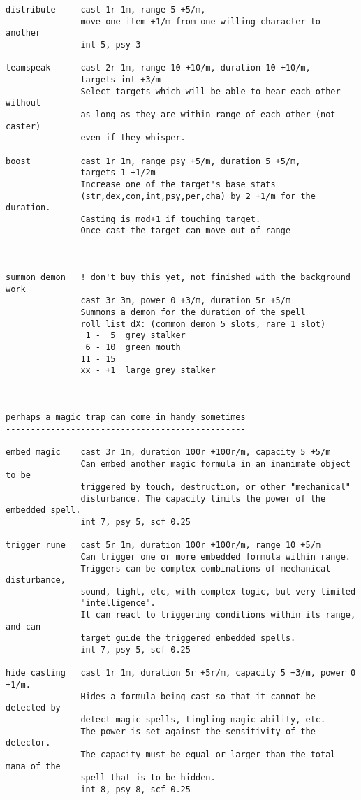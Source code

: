\begin{verbatim}
distribute     cast 1r 1m, range 5 +5/m,
               move one item +1/m from one willing character to another
               int 5, psy 3

teamspeak      cast 2r 1m, range 10 +10/m, duration 10 +10/m,
               targets int +3/m
               Select targets which will be able to hear each other without
               as long as they are within range of each other (not caster)
               even if they whisper.

boost          cast 1r 1m, range psy +5/m, duration 5 +5/m,
               targets 1 +1/2m
               Increase one of the target's base stats
               (str,dex,con,int,psy,per,cha) by 2 +1/m for the duration.
               Casting is mod+1 if touching target.
               Once cast the target can move out of range



summon demon   ! don't buy this yet, not finished with the background work
               cast 3r 3m, power 0 +3/m, duration 5r +5/m
               Summons a demon for the duration of the spell
               roll list dX: (common demon 5 slots, rare 1 slot)
                1 -  5  grey stalker
                6 - 10  green mouth
               11 - 15
               xx - +1  large grey stalker



perhaps a magic trap can come in handy sometimes
------------------------------------------------

embed magic    cast 3r 1m, duration 100r +100r/m, capacity 5 +5/m
               Can embed another magic formula in an inanimate object to be
               triggered by touch, destruction, or other "mechanical"
               disturbance. The capacity limits the power of the embedded spell.
               int 7, psy 5, scf 0.25

trigger rune   cast 5r 1m, duration 100r +100r/m, range 10 +5/m
               Can trigger one or more embedded formula within range.
               Triggers can be complex combinations of mechanical disturbance,
               sound, light, etc, with complex logic, but very limited
               "intelligence".
               It can react to triggering conditions within its range, and can
               target guide the triggered embedded spells.
               int 7, psy 5, scf 0.25

hide casting   cast 1r 1m, duration 5r +5r/m, capacity 5 +3/m, power 0 +1/m.
               Hides a formula being cast so that it cannot be detected by
               detect magic spells, tingling magic ability, etc.
               The power is set against the sensitivity of the detector.
               The capacity must be equal or larger than the total mana of the
               spell that is to be hidden.
               int 8, psy 8, scf 0.25


\end{verbatim} \normalsize
